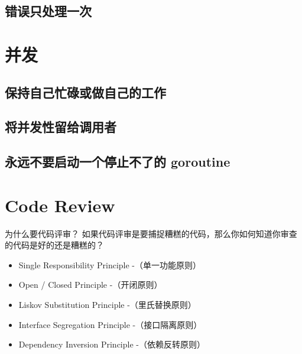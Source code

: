 \documentclass{paper}
\begin{document}
\subsection{错误只处理一次}

\section{并发}
\subsection{保持自己忙碌或做自己的工作}
\subsection{将并发性留给调用者}
\subsection{永远不要启动一个停止不了的 goroutine}

\section{Code Review}

为什么要代码评审？
如果代码评审是要捕捉糟糕的代码，那么你如何知道你审查的代码是好的还是糟糕的？

\begin{itemize}
	\item Single Responsibility Principle -（单一功能原则）
	\item Open / Closed Principle -（开闭原则）
	\item Liskov Substitution Principle -（里氏替换原则）
	\item Interface Segregation Principle -（接口隔离原则）
	\item Dependency Inversion Principle -（依赖反转原则）
\end{itemize}
\end{document}
